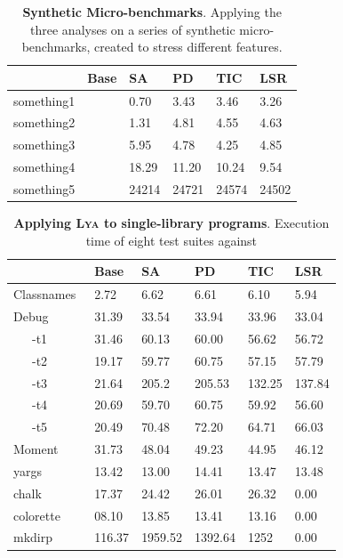 \documentclass[letterpaper,twocolumn,10pt]{article}
\newcommand{\sys}{{\scshape Lya}\xspace}
\newcommand{\fixme}[1]{{\color{red}#1}}
\begin{document}
\begin{table}[t]
\center
\footnotesize
\setlength\tabcolsep{3pt}
\caption{
  \footnotesize{
    \textbf{Synthetic Micro-benchmarks}.
		Applying the three analyses on a series of synthetic micro-benchmarks, created to stress different features.
  }
}
\begin{tabular*}{\columnwidth}{l @{\extracolsep{\fill}} ll lll}
\toprule
              &   Base    &  SA     & PD       &   TIC    &   LSR     \\
\midrule
something1    &           &  0.70   &    3.43  &   3.46   &   3.26    \\
something2    &           &  1.31   &    4.81  &   4.55   &   4.63    \\
something3    &           &  5.95   &    4.78  &   4.25   &   4.85    \\
something4    &           &  18.29  &   11.20  &   10.24  &   9.54    \\
something5    &           &  24214  &   24721  &   24574  &   24502   \\
\bottomrule
\end{tabular*}
\label{tab:synthetic}
\vspace{-5mm}
\end{table}

\begin{table}[t]
\center
\footnotesize
\setlength\tabcolsep{3pt}
\caption{
  \footnotesize{
    \textbf{Applying \sys to single-library programs}.
		\fixme{Execution time of eight test suites against }
  }
}
\begin{tabular*}{\columnwidth}{l @{\extracolsep{\fill}} ll lll}
\toprule
                    & Base   &  SA   & PD     &   TIC   & LSR     \\
\midrule
Classnames~\cite{}  &  2.72  & 6.62  &  6.61  &  6.10   & 5.94    \\
Debug~\cite{}       & 31.39  & 33.54 &  33.94 &  33.96  & 33.04   \\
~~~-t1              & 31.46  & 60.13 &  60.00 &  56.62  & 56.72   \\
~~~-t2              & 19.17  & 59.77 &  60.75 &  57.15  & 57.79   \\
~~~-t3              & 21.64  & 205.2 &  205.53&  132.25 & 137.84  \\
~~~-t4              & 20.69  & 59.70 &  60.75 &  59.92  & 56.60   \\
~~~-t5              & 20.49  & 70.48 &  72.20 &  64.71  & 66.03   \\
Moment~\cite{}      & 31.73  & 48.04 &  49.23 &  44.95  & 46.12   \\
yargs~\cite{}       & 13.42  & 13.00 &  14.41 &  13.47  & 13.48   \\
chalk~\cite{} 	    & 17.37  & 24.42 &  26.01 &  26.32  & 0.00    \\
colorette~\cite{}   & 08.10  & 13.85 &  13.41 &  13.16  & 0.00    \\
mkdirp~\cite{}      & 116.37 & 1959.52 & 1392.64 & 1252 & 0.00    \\
\bottomrule
\end{tabular*}
\label{tab:meso}
\vspace{-5mm}
\end{table}
\end{document}
